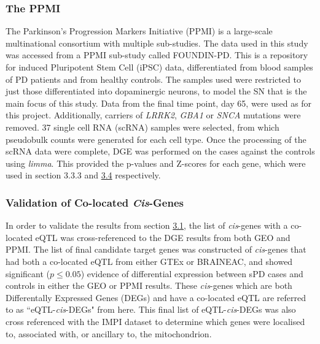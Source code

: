 \documentclass{article}
\begin{document}
\subsubsection{The PPMI}
The Parkinson's Progression Markers Initiative (PPMI)\cite{Marek2011ThePPMI} is a large-scale multinational consortium with multiple sub-studies. The data used in this study was accessed from a PPMI sub-study called FOUNDIN-PD\cite{Bressan2023TheMechanism}. This is a repository for induced Pluripotent Stem Cell (iPSC) data, differentiated from blood samples of PD patients and from healthy controls. The samples used were restricted to just those differentiated into dopaminergic neurons, to model the SN that is the main focus of this study. Data from the final time point, day 65, were used as for this project. Additionally, carriers of \textit{LRRK2}, \textit{GBA1} or \textit{SNCA} mutations were removed. 37 single cell RNA (scRNA) samples were selected, from which pseudobulk counts were generated for each cell type. Once the processing of the scRNA data were complete, DGE was performed on the cases against the controls using \textit{limma}\cite{Ritchie2015LimmaStudies}. This provided the p-values and Z-scores for each gene, which were used in section 3.3.3 and \hyperref[subsec:pathways]{3.4} respectively.
\subsubsection{Validation of Co-located \textit{Cis}-Genes}
In order to validate the results from section \hyperref[subsec:eQTL]{3.1}, the list of \textit{cis}-genes with a co-located eQTL was cross-referenced to the DGE results from both GEO and PPMI. The list of final candidate target genes was constructed of \textit{cis}-genes that had both a co-located eQTL from either GTEx or BRAINEAC, and showed significant ($p\leq0.05$) evidence of differential expression between sPD cases and controls in either the GEO or PPMI results. These \textit{cis}-genes which are both Differentally Expressed Genes (DEGs) and have a co-located eQTL are referred to as ``eQTL-\textit{cis}-DEGs" from here. This final list of eQTL-\textit{cis}-DEGs was also cross referenced with the IMPI dataset\cite{Smith2016MitoMinerDatabase} to determine which genes were localised to, associated with, or ancillary to, the mitochondrion.
\end{document}
